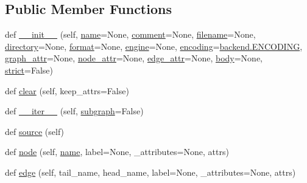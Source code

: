 \subsection*{Public Member Functions}
\begin{DoxyCompactItemize}
\item 
def \hyperlink{classgraphviz_1_1dot_1_1Dot_a93f3a7ad03f904b9bf1e52b5a2c92942}{\+\_\+\+\_\+init\+\_\+\+\_\+} (self, \hyperlink{classgraphviz_1_1dot_1_1Dot_a8770063bf65f4c1c5abb66e306e8a2c8}{name}=None, \hyperlink{classgraphviz_1_1dot_1_1Dot_af86327a4da464a67b07151e065c252b1}{comment}=None, \hyperlink{classgraphviz_1_1files_1_1File_ad8357bf1553bf74f1d05954c0a0986a8}{filename}=None, \hyperlink{classgraphviz_1_1files_1_1File_a17fd3abb3628eca94effe35cf1237a73}{directory}=None, \hyperlink{classgraphviz_1_1files_1_1File_acd2dce8967c8ff4c00ad6c47872dc340}{format}=None, \hyperlink{classgraphviz_1_1files_1_1File_aabc771621d8e81fccc4003231716e9cf}{engine}=None, \hyperlink{classgraphviz_1_1files_1_1File_aec4aaf697774bce61c327584985eb42b}{encoding}=\hyperlink{namespacegraphviz_1_1backend_aaa5c3555a484c96a0b0e5356ce3a577d}{backend.\+E\+N\+C\+O\+D\+I\+NG}, \hyperlink{classgraphviz_1_1dot_1_1Dot_a158faacad5caf468932bbb891f6465ce}{graph\+\_\+attr}=None, \hyperlink{classgraphviz_1_1dot_1_1Dot_aaac93f4deda12a49316c442df4633d50}{node\+\_\+attr}=None, \hyperlink{classgraphviz_1_1dot_1_1Dot_a7658b0204c84c1401744c56abe9d6fd9}{edge\+\_\+attr}=None, \hyperlink{classgraphviz_1_1dot_1_1Dot_a445a58c4a1ec19e89778e3a9bf026415}{body}=None, \hyperlink{classgraphviz_1_1dot_1_1Dot_aa54e02b54826b368aaffd59855fecddf}{strict}=False)
\item 
def \hyperlink{classgraphviz_1_1dot_1_1Dot_a9e663d6ac500c91024eb8c6a5d94a0c0}{clear} (self, keep\+\_\+attrs=False)
\item 
def \hyperlink{classgraphviz_1_1dot_1_1Dot_afe958e1e39f769a9bb6f0af514c2affc}{\+\_\+\+\_\+iter\+\_\+\+\_\+} (self, \hyperlink{classgraphviz_1_1dot_1_1Dot_afd0431341f53b05bab054c6bf1ade7ea}{subgraph}=False)
\item 
def \hyperlink{classgraphviz_1_1dot_1_1Dot_a3186e73a3478512be5ab6b3106dac162}{source} (self)
\item 
def \hyperlink{classgraphviz_1_1dot_1_1Dot_ac60d7ff64538a6cb84516a1d4bcf0200}{node} (self, \hyperlink{classgraphviz_1_1dot_1_1Dot_a8770063bf65f4c1c5abb66e306e8a2c8}{name}, label=None, \+\_\+attributes=None, attrs)
\item 
def \hyperlink{classgraphviz_1_1dot_1_1Dot_aef2b20ff62cdd7bd9d8d018ac74f5e8b}{edge} (self, tail\+\_\+name, head\+\_\+name, label=None, \+\_\+attributes=None, attrs)

\end{DoxyCompactItemize}
